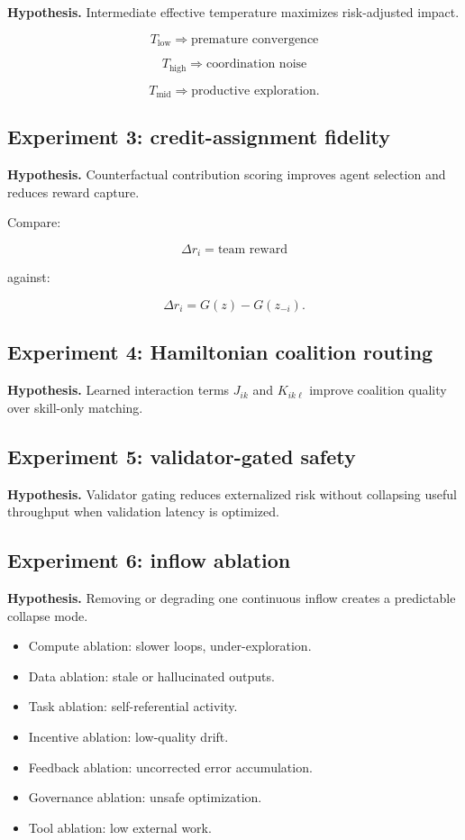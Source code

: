 \documentclass[
  11pt,
]{article}
\providecommand{\tightlist}{%
  \setlength{\itemsep}{0pt}\setlength{\parskip}{0pt}}
\begin{document}
\textbf{Hypothesis.} Intermediate effective temperature maximizes
risk-adjusted impact.

\[
T_{\text{low}}\Rightarrow\text{premature convergence}
\]

\[
T_{\text{high}}\Rightarrow\text{coordination noise}
\]

\[
T_{\text{mid}}\Rightarrow\text{productive exploration}.
\]

\subsection{Experiment 3: credit-assignment
fidelity}\label{experiment-3-credit-assignment-fidelity}

\textbf{Hypothesis.} Counterfactual contribution scoring improves agent
selection and reduces reward capture.

Compare:

\[
\Delta r_i=\text{team reward}
\]

against:

\[
\Delta r_i=G(z)-G(z_{-i}).
\]

\subsection{Experiment 4: Hamiltonian coalition
routing}\label{experiment-4-hamiltonian-coalition-routing}

\textbf{Hypothesis.} Learned interaction terms \(J_{ik}\) and
\(K_{ik\ell}\) improve coalition quality over skill-only matching.

\subsection{Experiment 5: validator-gated
safety}\label{experiment-5-validator-gated-safety}

\textbf{Hypothesis.} Validator gating reduces externalized risk without
collapsing useful throughput when validation latency is optimized.

\subsection{Experiment 6: inflow
ablation}\label{experiment-6-inflow-ablation}

\textbf{Hypothesis.} Removing or degrading one continuous inflow creates
a predictable collapse mode.

\begin{itemize}
\tightlist
\item
  Compute ablation: slower loops, under-exploration.
\item
  Data ablation: stale or hallucinated outputs.
\item
  Task ablation: self-referential activity.
\item
  Incentive ablation: low-quality drift.
\item
  Feedback ablation: uncorrected error accumulation.
\item
  Governance ablation: unsafe optimization.
\item
  Tool ablation: low external work.
\end{itemize}
\end{document}
